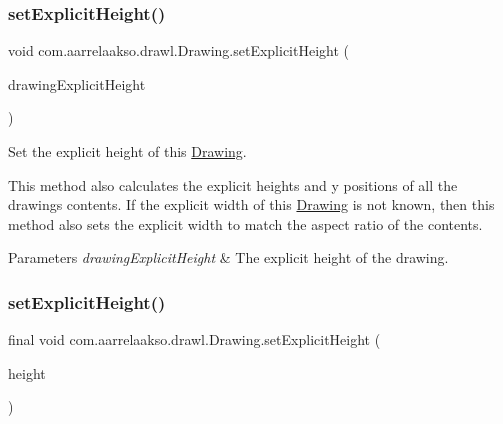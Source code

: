 \subsubsection{\texorpdfstring{set\+Explicit\+Height()}{setExplicitHeight()}\hspace{0.1cm}{\footnotesize\ttfamily [1/3]}}
{\footnotesize\ttfamily void com.\+aarrelaakso.\+drawl.\+Drawing.\+set\+Explicit\+Height (\begin{DoxyParamCaption}\item[{@Not\+Null final \hyperlink{interfacecom_1_1aarrelaakso_1_1drawl_1_1_number}{Number}}]{drawing\+Explicit\+Height }\end{DoxyParamCaption})\hspace{0.3cm}{\ttfamily [private]}}



Set the explicit height of this \hyperlink{classcom_1_1aarrelaakso_1_1drawl_1_1_drawing}{Drawing}. 

This method also calculates the explicit heights and y positions of all the drawing\textquotesingle{}s contents. If the explicit width of this \hyperlink{classcom_1_1aarrelaakso_1_1drawl_1_1_drawing}{Drawing} is not known, then this method also sets the explicit width to match the aspect ratio of the contents.


\begin{DoxyParams}{Parameters}
{\em drawing\+Explicit\+Height} & The explicit height of the drawing. \\
\hline
\end{DoxyParams}
\mbox{\label{classcom_1_1aarrelaakso_1_1drawl_1_1_drawing_a4a88952ac7f26d5a3be9aa3d32e2643a}} 
\subsubsection{\texorpdfstring{set\+Explicit\+Height()}{setExplicitHeight()}\hspace{0.1cm}{\footnotesize\ttfamily [2/3]}}
{\footnotesize\ttfamily final void com.\+aarrelaakso.\+drawl.\+Drawing.\+set\+Explicit\+Height (\begin{DoxyParamCaption}\item[{final Float}]{height }\end{DoxyParamCaption})}



